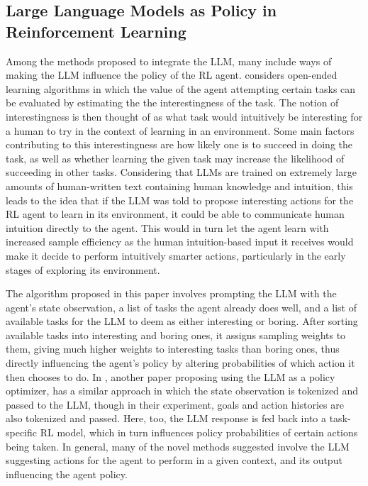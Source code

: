 \documentclass[conference]{IEEEtran}
\begin{document}
\subsection{Large Language Models as Policy in Reinforcement Learning} 

Among the methods proposed to integrate the LLM, many include ways of making the LLM influence the policy of the RL agent. \cite{omni} considers open-ended learning algorithms in which the value of the agent attempting certain tasks can be evaluated by estimating the the interestingness of the task. The notion of interestingness is then thought of as what task would intuitively be interesting for a human to try in the context of learning in an environment. Some main factors contributing to this interestingness are how likely one is to succeed in doing the task, as well as whether learning the given task may increase the likelihood of succeeding in other tasks. Considering that LLMs are trained on extremely large amounts of human-written text containing human knowledge and intuition, this leads to the idea that if the LLM was told to propose interesting actions for the RL agent to learn in its environment, it could be able to communicate human intuition directly to the agent. This would in turn let the agent learn with increased sample efficiency as the human intuition-based input it receives would make it decide to perform intuitively smarter actions, particularly in the early stages of exploring its environment.

The algorithm proposed in this paper involves prompting the LLM with the agent's state observation, a list of tasks the agent already does well, and a list of available tasks for the LLM to deem as either interesting or boring. After sorting available tasks into interesting and boring ones, it assigns sampling weights to them, giving much higher weights to interesting tasks than boring ones, thus directly influencing the agent's policy by altering probabilities of which action it then chooses to do. In \cite{idm}, another paper proposing using the LLM as a policy optimizer, has a similar approach in which the state observation is tokenized and passed to the LLM, though in their experiment, goals and action histories are also tokenized and passed. Here, too, the LLM response is fed back into a task-specific RL model, which in turn influences policy probabilities of certain actions being taken. In general, many of the novel methods suggested involve the LLM suggesting actions for the agent to perform in a given context, and its output influencing the agent policy. 
\end{document}
